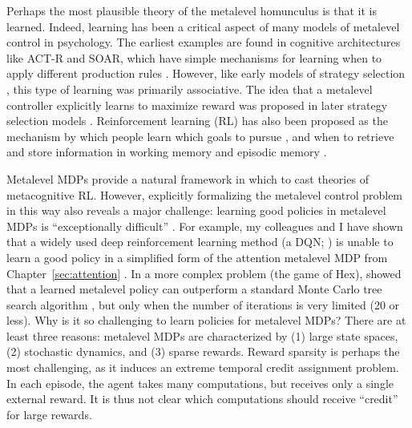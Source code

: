 Perhaps the most plausible theory of the metalevel homunculus is that it is learned. Indeed, learning has been a critical aspect of many models of metalevel control in psychology. The earliest examples are found in cognitive architectures like ACT-R and SOAR, which have simple mechanisms for learning when to apply different production rules \citep{laird1986chunking}. However, like early models of strategy selection \citep{shrager1998scads}, this type of learning was primarily associative. The idea that a metalevel controller explicitly learns to maximize reward was proposed in later strategy selection models \citep{erev2005adaptation,rieskamp2006ssl,lieder2017strategy}. Reinforcement learning (RL) has also been proposed as the mechanism by which people learn which goals to pursue \citep{cushman2015habitual}, and when to retrieve and store information in working memory \citep{oreilly2006making,todd2008learning} and episodic memory \citep{lu2022neural}. 

Metalevel MDPs provide a natural framework in which to cast theories of metacognitive RL. However, explicitly formalizing the metalevel control problem in this way also reveals a major challenge: learning good policies in metalevel MDPs is ``exceptionally difficult'' \citep{hay2016principles}. For example, my colleagues and I have shown that a widely used deep reinforcement learning method (a DQN; \citealp{mnih2015humanlevel}) is unable to learn a good policy in a simplified form of the attention metalevel MDP from Chapter~\ref{sec:attention} \citep{callaway2018learning}. In a more complex problem (the game of Hex), \citet{hay2016principles} showed that a learned metalevel policy can outperform a standard Monte Carlo tree search algorithm \citep{kocsis2006bandit}, but only when the number of iterations is very limited (20 or less). Why is it so challenging to learn policies for metalevel MDPs? There are at least three reasons: metalevel MDPs are characterized by (1) large state spaces, (2) stochastic dynamics, and (3) sparse rewards. Reward sparsity is perhaps the most challenging, as it induces an extreme temporal credit assignment problem. In each episode, the agent takes many computations, but receives only a single external reward. It is thus not clear which computations should receive ``credit'' for large rewards. 

